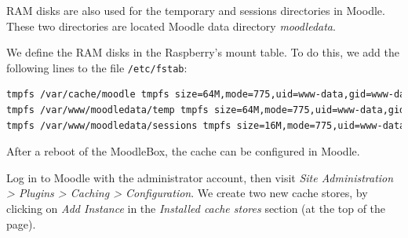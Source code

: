 \documentclass[12pt]{article}
\begin{document}
RAM disks are also used for the temporary and sessions directories in Moodle.
These two directories are located Moodle data directory \emph{moodledata}.

We define the RAM disks in the Raspberry's mount table.
To do this, we add the following lines to the file \lstinline{/etc/fstab}:
\begin{lstlisting}[language=bash]
tmpfs /var/cache/moodle tmpfs size=64M,mode=775,uid=www-data,gid=www-data 0 0
tmpfs /var/www/moodledata/temp tmpfs size=64M,mode=775,uid=www-data,gid=www-data 0 0
tmpfs /var/www/moodledata/sessions tmpfs size=16M,mode=775,uid=www-data,gid=www-data 0 0
\end{lstlisting}

%
%

After a reboot of the MoodleBox, the cache can be configured in Moodle.

Log in to Moodle with the administrator account, then visit \textsl{Site Administration > Plugins > Caching > Configuration}.
We create two new cache stores, by clicking on \emph{Add Instance} in the \emph{Installed cache stores} section (at the top of the page).
\end{document}
